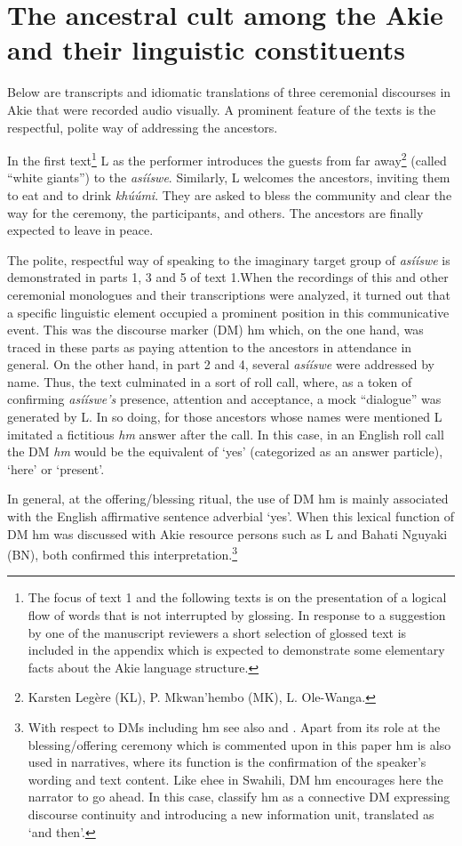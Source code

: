\documentclass[output=paper,colorlinks,citecolor=brown]{langscibook}
\begin{document}
\section{The  ancestral cult among the Akie and their linguistic constituents}\label{sec:legere:4}

Below are transcripts and idiomatic translations of three ceremonial discourses in Akie that were recorded audio visually. A prominent feature of the texts is the respectful, polite way of addressing the ancestors. 

In the first text\footnote{The focus of text 1 and the following texts is on the presentation of a logical flow of words that is not interrupted by glossing. In response to a suggestion by one of the manuscript reviewers a short selection of glossed text is included in the appendix which is expected to demonstrate some elementary facts about the Akie language structure.}  L as the performer introduces the guests from far away\footnote{Karsten Legère (KL), P. Mkwan’hembo (MK), L. Ole-Wanga.} (called “white giants”) to the \textit{asííswe}. Similarly, L welcomes the ancestors, inviting them to eat and to drink \textit{khúúmi}. They are asked to bless the community and clear the way for the ceremony, the participants, and others. The ancestors are finally expected to leave in peace.

The polite, respectful way of speaking to the imaginary target group of \textit{asííswe} is demonstrated in parts 1, 3 and 5 of text 1.When the recordings of this and other ceremonial monologues and their transcriptions were analyzed, it turned out that a specific linguistic element occupied a prominent position in this communicative event. This was the discourse marker (DM) hm which, on the one hand, was traced in these parts as paying attention to the ancestors in attendance in general. On the other hand, in part 2 and 4, several \textit{asííswe} were addressed by name. Thus, the text culminated in a sort of roll call,  where, as a token of confirming \textit{asííswe’s} presence, attention and acceptance, a mock “dialogue” was generated by L. In so doing, for those ancestors whose names were mentioned L imitated a fictitious \textit{hm} answer after the call. In this case, in an English roll call the DM \textit{hm} would be the equivalent of ‘yes’ (categorized as an answer particle), ‘here’ or ‘present’.

In general, at the offering/blessing ritual, the use of DM hm is mainly associated  with the English affirmative sentence adverbial ‘yes’. When this lexical function of DM hm was discussed with Akie resource persons such as L and Bahati Nguyaki (BN), both confirmed  this interpretation.\footnote{ With respect to DMs including hm see also \cite{HeineEtAl2017} and \cite[137-146]{KonigEtAl2015}. Apart from its role at the blessing/offering ceremony which is commented upon in this paper hm is also used in narratives, where its function is the confirmation of the speaker’s wording and text content. Like ehee in Swahili, DM hm encourages here the narrator to go ahead. In this case, \cite[152]{HeineEtAl2017}  classify hm as a connective DM expressing discourse continuity and introducing a new information unit, translated as ‘and then’.}
\end{document}
